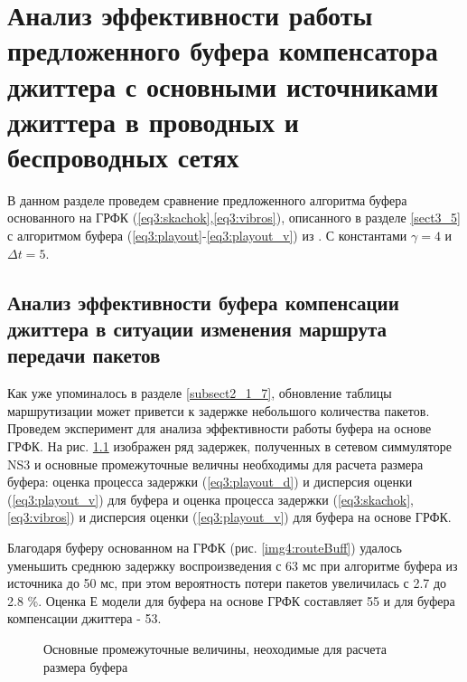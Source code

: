 \chapter{Анализ эффективности работы предложенного буфера компенсатора джиттера с основными источниками джиттера в проводных и беспроводных сетях} \label{chapt4}
В данном разделе проведем сравнение предложенного алгоритма буфера основанного на ГРФК (\ref{eq3:skachok},\ref{eq3:vibros}), описанного в разделе \ref{sect3_5} с алгоритмом буфера (\ref{eq3:playout}-\ref{eq3:playout_v}) из \cite{Ramjee}. С константами $\gamma=4$ и $\Delta t=5$.


\section{Анализ эффективности буфера компенсации джиттера в ситуации изменения маршрута передачи пакетов} \label{sect4}

Как уже упоминалось в разделе \ref{subsect2_1_7}, обновление таблицы маршрутизации может приветси к задержке небольшого количества пакетов. Проведем эксперимент для анализа эффективности работы буфера на основе ГРФК. На рис. \ref{img4:routeEst} изображен ряд задержек, полученных в сетевом симмуляторе NS3 и основные промежуточные величны необходимы для расчета размера буфера: оценка процесса задержки (\ref{eq3:playout_d}) и дисперсия оценки (\ref{eq3:playout_v}) для буфера \cite{Ramjee} и оценка процесса задержки (\ref{eq3:skachok},\ref{eq3:vibros}) и дисперсия оценки (\ref{eq3:playout_v}) для буфера на основе ГРФК.

Благодаря буферу основанном на ГРФК (рис. \ref{img4:routeBuff}) удалось уменьшить среднюю задержку воспроизведения с 63 мс при алгоритме буфера из источника \cite{Ramjee} до 50 мс, при этом вероятность потери пакетов увеличилась с 2.7 до 2.8 \%. Оценка Е модели для буфера на основе ГРФК составляет 55 и для буфера компенсации джиттера  \cite{Ramjee} - 53.


\pgfplotsset{width=15cm, height=10cm, compat=1.3}
\begin{figure} [!h]
  \center
{}
\caption{Основные промежуточные величины, неоходимые для расчета размера буфера}
  \label{img4:routeEst}
\end{figure}





